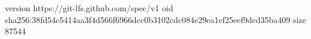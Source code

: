 version https://git-lfs.github.com/spec/v1
oid sha256:38fd54c5414aa3f4d566f6966dcc0b3102cdc084e29ea1ef25eef9dcd35ba409
size 87544

